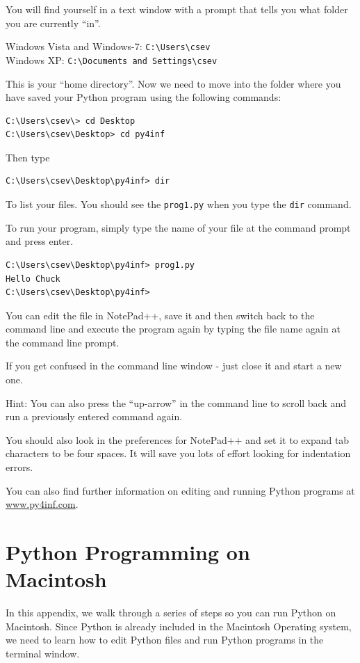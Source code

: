 \documentclass[11pt]{book}
\begin{document}
You will find yourself in a text window with a prompt that
tells you what folder you are currently ``in''.  

Windows Vista and Windows-7: {\tt C:{\textbackslash}Users{\textbackslash}csev}\\
Windows XP: {\tt C:{\textbackslash}Documents and Settings{\textbackslash}csev}

This is your ``home directory''.  Now we need to move into 
the folder where you have saved your Python program using
the following commands:

\beforeverb
\begin{verbatim}
C:\Users\csev\> cd Desktop
C:\Users\csev\Desktop> cd py4inf
\end{verbatim}
\afterverb
%
Then type 

\beforeverb
\begin{verbatim}
C:\Users\csev\Desktop\py4inf> dir 
\end{verbatim}
\afterverb
%
To list your files.  You should see the {\tt prog1.py} when 
you type the {\tt dir} command.

To run your program, simply type the name of your file at the 
command prompt and press enter.

\beforeverb
\begin{verbatim}
C:\Users\csev\Desktop\py4inf> prog1.py
Hello Chuck
C:\Users\csev\Desktop\py4inf> 
\end{verbatim}
\afterverb
%
You can edit the file in NotePad++, save it and then switch back
to the command line and execute the program again by typing
the file name again at the command line prompt.

If you get confused in the command line window - just close it
and start a new one.

Hint: You can also press the ``up-arrow'' in the command line to 
scroll back and run a previously entered command again.

You should also look in the preferences for NotePad++ and set it 
to expand tab characters to be four spaces.  It will save you lots
of effort looking for indentation errors.

You can also find further information on editing and running 
Python programs at \url{www.py4inf.com}.

\chapter{Python Programming on Macintosh}

In this appendix, we walk through a series of steps
so you can run Python on Macintosh.  Since Python is
already included in the Macintosh Operating system, we need to 
learn how to edit Python files and run Python programs
in the terminal window.
\end{document}
